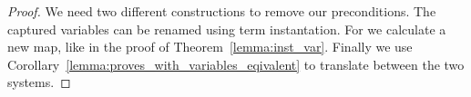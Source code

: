 \begin{corollary}
    \begin{isabelle}
    \end{isabelle}
\end{corollary}
\begin{proof}
    We need two different constructions to remove our preconditions.
    The captured variables can be renamed using term instantation.
    For  we calculate a new map, like in the proof of Theorem~\ref{lemma:inst_var}.
    Finally we use Corollary~\ref{lemma:proves_with_variables_eqivalent} to translate between the two systems.
\end{proof}